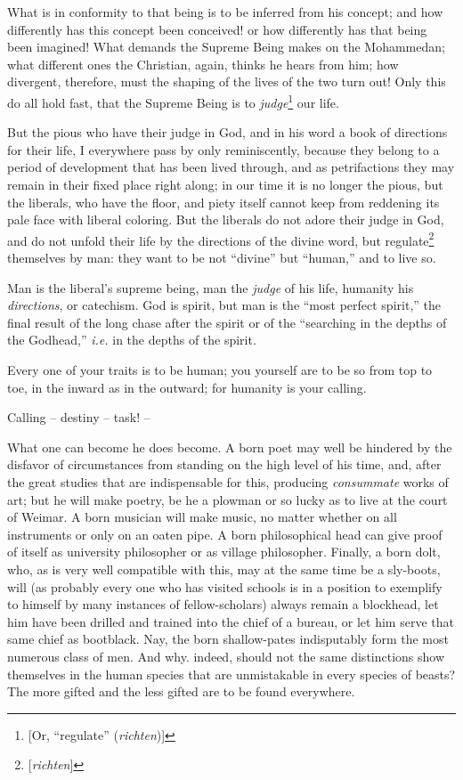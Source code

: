What is in conformity to that being is to be inferred from his concept; and 
how differently has this concept been conceived! or how differently has that 
being been imagined! What demands the Supreme Being makes on the Mohammedan; 
what different ones the Christian, again, thinks he hears from him; how 
divergent, therefore, must the shaping of the lives of the two turn out! Only 
this do all hold fast, that the Supreme Being is to 
\textit{judge}\footnote{[Or, ``regulate'' (\textit{richten})]} our life.

But the pious who have their judge in God, and in his word a book of 
directions for their life, I everywhere pass by only reminiscently, because 
they belong to a period of development that has been lived through, and as 
petrifactions they may remain in their fixed place right along; in our time it 
is no longer the pious, but the liberals, who have the floor, and piety itself 
cannot keep from reddening its pale face with liberal coloring. But the 
liberals do not adore their judge in God, and do not unfold their life by the 
directions of the divine word, but regulate\footnote{[\textit{richten}]} 
themselves by man: they want to be not ``divine'' but ``human,'' and to 
live so.

Man is the liberal's supreme being, man the \textit{judge} of his life, 
humanity his \textit{directions}, or catechism. God is spirit, but man is the 
``most perfect spirit,'' the final result of the long chase after the spirit 
or of the ``searching in the depths of the Godhead,'' \textit{i.e.} in the 
depths of the spirit.

Every one of your traits is to be human; you yourself are to be so from top to 
toe, in the inward as in the outward; for humanity is your calling.

Calling -- destiny -- task! --

What one can become he does become. A born poet may well be hindered by the 
disfavor of circumstances from standing on the high level of his time, and, 
after the great studies that are indispensable for this, producing 
\textit{consummate} works of art; but he will make poetry, be he a plowman or 
so lucky as to live at the court of Weimar. A born musician will make music, 
no matter whether on all instruments or only on an oaten pipe. A born 
philosophical head can give proof of itself as university philosopher or as 
village philosopher. Finally, a born dolt, who, as is very well compatible 
with this, may at the same time be a sly-boots, will (as probably every one 
who has visited schools is in a position to exemplify to himself by many 
instances of fellow-scholars) always remain a blockhead, let him have been 
drilled and trained into the chief of a bureau, or let him serve that same 
chief as bootblack. Nay, the born shallow-pates indisputably form the most 
numerous class of men. And why. indeed, should not the same distinctions show 
themselves in the human species that are unmistakable in every species of 
beasts? The more gifted and the less gifted are to be found everywhere.

